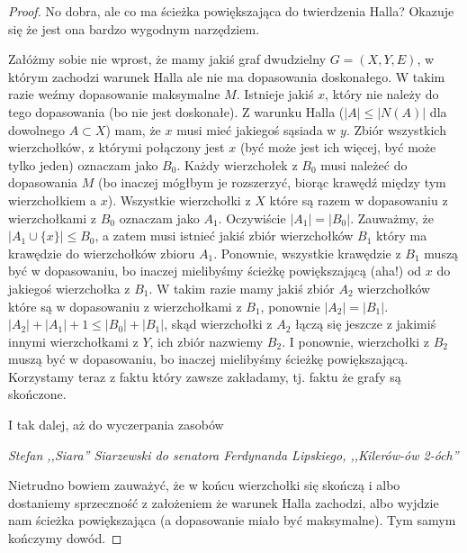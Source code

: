 \begin{proof}
	No dobra, ale co ma ścieżka powiększająca do twierdzenia Halla? Okazuje się że jest ona bardzo wygodnym narzędziem.

	Załóżmy sobie nie wprost, że mamy jakiś graf dwudzielny $G = (X,Y,E)$, w którym zachodzi warunek Halla ale nie ma dopasowania doskonałego. W takim razie weźmy dopasowanie maksymalne $M$. Istnieje jakiś $x$, który nie należy do tego dopasowania (bo nie jest doskonałe). Z warunku Halla ($|A| \leq |N(A)|$ dla dowolnego $A \subset X$) mam, że $x$ musi mieć jakiegoś sąsiada w $y$. Zbiór wszystkich wierzchołków, z którymi połączony jest $x$ (być może jest ich więcej, być może tylko jeden) oznaczam jako $B_0$. Każdy wierzchołek z $B_0$ musi należeć do dopasowania $M$ (bo inaczej mógłbym je rozszerzyć, biorąc krawędź między tym wierzchołkiem a $x$). Wszystkie wierzchołki z $X$ które są razem w dopasowaniu z wierzchołkami z $B_0$ oznaczam jako $A_1$. Oczywiście $|A_1| = |B_0|$. Zauważmy, że $|A_1 \cup \{x\}| \leq B_0$, a zatem musi istnieć jakiś zbiór wierzchołków $B_1$ który ma krawędzie do wierzchołków zbioru $A_1$. Ponownie, wszystkie krawędzie z $B_1$ muszą być w dopasowaniu, bo inaczej mielibyśmy ścieżkę powiększającą (aha!) od $x$ do jakiegoś wierzchołka z $B_1$. W takim razie mamy jakiś zbiór $A_2$ wierzchołków które są w dopasowaniu z wierzchołkami z $B_1$, ponownie $|A_2| = |B_1|$. $|A_2| + |A_1| + 1 \leq |B_0| + |B_1|$, skąd wierzchołki z $A_2$ łączą się jeszcze z jakimiś innymi wierzchołkami z $Y$, ich zbiór nazwiemy $B_2$. I ponownie, wierzchołki z $B_2$ muszą być w dopasowaniu, bo inaczej mielibyśmy ścieżkę powiększającą. Korzystamy teraz z faktu który zawsze zakładamy, tj. faktu że grafy są skończone.

	\epigraph{I tak dalej, aż do wyczerpania zasobów}{\textit{Stefan ,,Siara'' Siarzewski do senatora Ferdynanda Lipskiego, ,,Kilerów-ów 2-óch''}}

	Nietrudno bowiem zauważyć, że w końcu wierzchołki się skończą i albo dostaniemy sprzeczność z założeniem że warunek Halla zachodzi, albo wyjdzie nam ścieżka powiększająca (a dopasowanie miało być maksymalne). Tym samym kończymy dowód.
\end{proof}